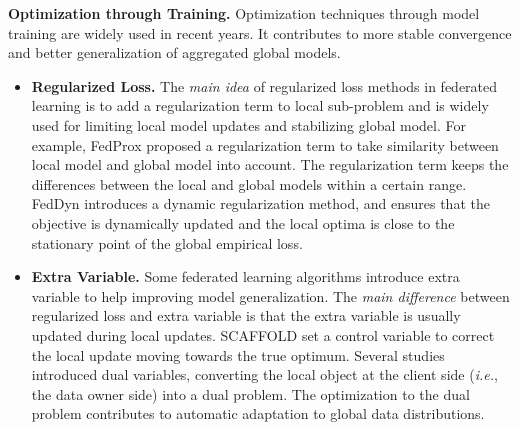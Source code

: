 \documentclass[11pt]{article}
\newcommand{\ie}{\textit{i.e.},\xspace}
\newcommand{\fakeparagraph}[1]{\vspace{1mm}\noindent\textbf{#1.}}
\begin{document}
\fakeparagraph{Optimization through Training}
Optimization techniques through model training are widely used in recent years. It contributes to more stable convergence and better generalization of aggregated global models.
\begin{itemize}
    \item \textbf{Regularized Loss.}
    The \textit{main idea} of regularized loss methods in federated learning is to add a regularization term to local sub-problem and is widely used for limiting local model updates and stabilizing global model.
    For example, \textsf{FedProx} \cite{Yongxin-DBLP:conf/mlsys/LiSZSTS20} proposed a regularization term to take similarity between local model and global model into account. The regularization term keeps the differences between the local and global models within a certain range.
    \textsf{FedDyn} \cite{Yongxin-DBLP:conf/iclr/AcarZNMWS21} introduces a dynamic regularization method, and ensures that the objective is dynamically updated and the local optima is close to the stationary point of the global empirical loss.
	
    \item \textbf{Extra Variable.}
    Some federated learning algorithms introduce extra variable to help improving model generalization. The \textit{main difference} between regularized loss and extra variable is that the extra variable is usually updated during local updates.
    \textsf{SCAFFOLD} \cite{Yongxin-DBLP:conf/icml/KarimireddyKMRS20} set a control variable to correct the local update moving towards the true optimum.
    Several studies \cite{Yongxin-DBLP:conf/nips/Tran-DinhPPN21, Yongxin-DBLP:conf/icde/GongLF22} introduced dual variables, converting the local object at the client side (\ie the data owner side) into a dual problem. The optimization to the dual problem contributes to automatic adaptation to global data distributions.
\end{itemize}
\end{document}
